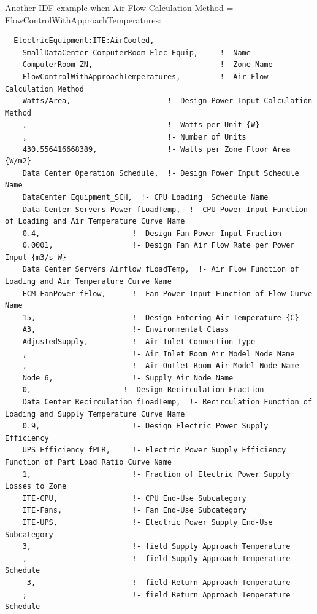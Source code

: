 Another IDF example when Air Flow Calculation Method = FlowControlWithApproachTemperatures:

\begin{lstlisting}
  ElectricEquipment:ITE:AirCooled,
    SmallDataCenter ComputerRoom Elec Equip,     !- Name
    ComputerRoom ZN,                             !- Zone Name
    FlowControlWithApproachTemperatures,         !- Air Flow Calculation Method
    Watts/Area,                      !- Design Power Input Calculation Method
    ,                                !- Watts per Unit {W}
    ,                                !- Number of Units
    430.556416668389,                !- Watts per Zone Floor Area {W/m2}
    Data Center Operation Schedule,  !- Design Power Input Schedule Name
    DataCenter Equipment_SCH,  !- CPU Loading  Schedule Name
    Data Center Servers Power fLoadTemp,  !- CPU Power Input Function of Loading and Air Temperature Curve Name
    0.4,                     !- Design Fan Power Input Fraction
    0.0001,                  !- Design Fan Air Flow Rate per Power Input {m3/s-W}
    Data Center Servers Airflow fLoadTemp,  !- Air Flow Function of Loading and Air Temperature Curve Name
    ECM FanPower fFlow,      !- Fan Power Input Function of Flow Curve Name
    15,                      !- Design Entering Air Temperature {C}
    A3,                      !- Environmental Class
    AdjustedSupply,          !- Air Inlet Connection Type
    ,                        !- Air Inlet Room Air Model Node Name
    ,                        !- Air Outlet Room Air Model Node Name
    Node 6, 			     !- Supply Air Node Name
    0,                     !- Design Recirculation Fraction
    Data Center Recirculation fLoadTemp,  !- Recirculation Function of Loading and Supply Temperature Curve Name
    0.9,                     !- Design Electric Power Supply Efficiency
    UPS Efficiency fPLR,     !- Electric Power Supply Efficiency Function of Part Load Ratio Curve Name
    1,                       !- Fraction of Electric Power Supply Losses to Zone
    ITE-CPU,                 !- CPU End-Use Subcategory
    ITE-Fans,                !- Fan End-Use Subcategory
    ITE-UPS,                 !- Electric Power Supply End-Use Subcategory
    3,                       !- field Supply Approach Temperature
    ,                        !- field Supply Approach Temperature Schedule
    -3,                      !- field Return Approach Temperature
    ;                        !- field Return Approach Temperature Schedule
\end{lstlisting}


